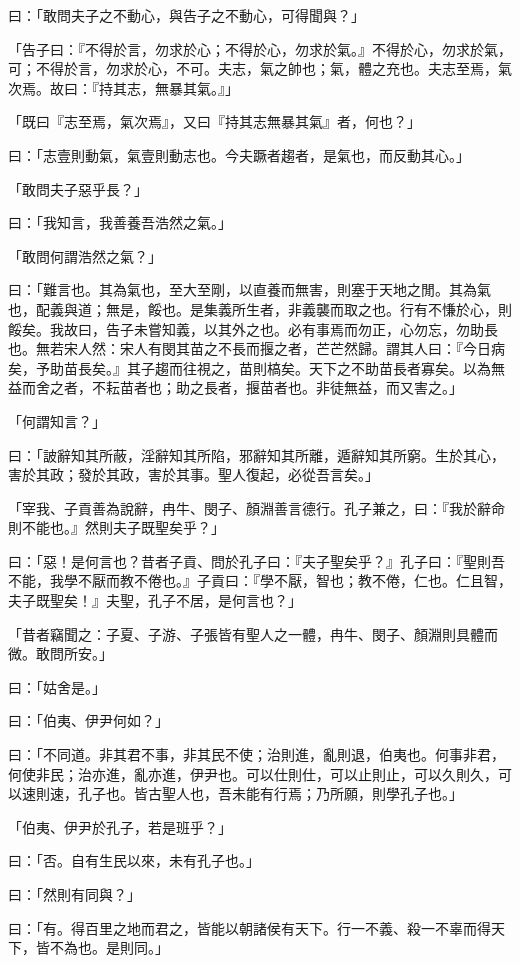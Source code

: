 \begin{pinyinscope}
曰：「敢問夫子之不動心，與告子之不動心，可得聞與？」

「告子曰：『不得於言，勿求於心；不得於心，勿求於氣。』不得於心，勿求於氣，可；不得於言，勿求於心，不可。夫志，氣之帥也；氣，體之充也。夫志至焉，氣次焉。故曰：『持其志，無暴其氣。』」

「既曰『志至焉，氣次焉』，又曰『持其志無暴其氣』者，何也？」

曰：「志壹則動氣，氣壹則動志也。今夫蹶者趨者，是氣也，而反動其心。」

「敢問夫子惡乎長？」

曰：「我知言，我善養吾浩然之氣。」

「敢問何謂浩然之氣？」

曰：「難言也。其為氣也，至大至剛，以直養而無害，則塞于天地之閒。其為氣也，配義與道；無是，餒也。是集義所生者，非義襲而取之也。行有不慊於心，則餒矣。我故曰，告子未嘗知義，以其外之也。必有事焉而勿正，心勿忘，勿助長也。無若宋人然：宋人有閔其苗之不長而揠之者，芒芒然歸。謂其人曰：『今日病矣，予助苗長矣。』其子趨而往視之，苗則槁矣。天下之不助苗長者寡矣。以為無益而舍之者，不耘苗者也；助之長者，揠苗者也。非徒無益，而又害之。」

「何謂知言？」

曰：「詖辭知其所蔽，淫辭知其所陷，邪辭知其所離，遁辭知其所窮。生於其心，害於其政；發於其政，害於其事。聖人復起，必從吾言矣。」

「宰我、子貢善為說辭，冉牛、閔子、顏淵善言德行。孔子兼之，曰：『我於辭命則不能也。』然則夫子既聖矣乎？」

曰：「惡！是何言也？昔者子貢、問於孔子曰：『夫子聖矣乎？』孔子曰：『聖則吾不能，我學不厭而教不倦也。』子貢曰：『學不厭，智也；教不倦，仁也。仁且智，夫子既聖矣！』夫聖，孔子不居，是何言也？」

「昔者竊聞之：子夏、子游、子張皆有聖人之一體，冉牛、閔子、顏淵則具體而微。敢問所安。」

曰：「姑舍是。」

曰：「伯夷、伊尹何如？」

曰：「不同道。非其君不事，非其民不使；治則進，亂則退，伯夷也。何事非君，何使非民；治亦進，亂亦進，伊尹也。可以仕則仕，可以止則止，可以久則久，可以速則速，孔子也。皆古聖人也，吾未能有行焉；乃所願，則學孔子也。」

「伯夷、伊尹於孔子，若是班乎？」

曰：「否。自有生民以來，未有孔子也。」

曰：「然則有同與？」

曰：「有。得百里之地而君之，皆能以朝諸侯有天下。行一不義、殺一不辜而得天下，皆不為也。是則同。」


\end{pinyinscope}
